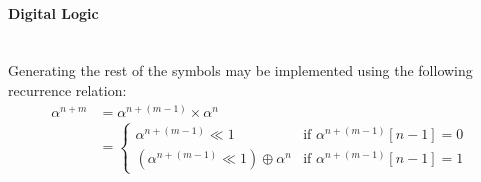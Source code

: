 
        \paragraph{Digital Logic} \leavevmode \\ Generating the rest of the
        symbols may be implemented using the following recurrence relation:
        \begin{equation*}
            \begin{split}
                \alpha^{n+m} & =\alpha^{n+(m-1)}\times \alpha^{n} \\
                & = \begin{cases}
                        \alpha^{n+(m-1)} \ll 1 &
                        \text{if $\alpha^{n+(m-1)}[n-1] = 0$} \\
                        (\alpha^{n+(m-1)} \ll 1 ) \oplus \alpha^{n} &
                        \text{if $\alpha^{n+(m-1)}[n-1] = 1$}
                    \end{cases}
            \end{split}
        \end{equation*}

